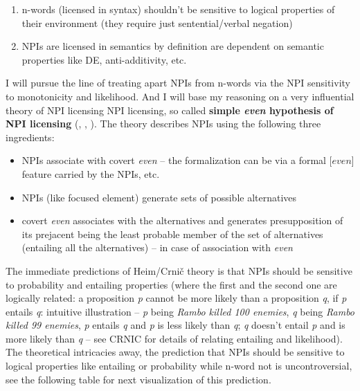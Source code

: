 \documentclass[12pt]{scrartcl}
\providecommand{\tightlist}{%
  \setlength{\itemsep}{0pt}\setlength{\parskip}{0pt}}
\begin{document}
\begin{enumerate}
  \def\labelenumi{\arabic{enumi})}
  \tightlist
  \item
    n-words (licensed in syntax) shouldn't be sensitive to logical properties of
    their environment (they require just sentential/verbal negation)
  \item
    NPIs are licensed in semantics by definition are dependent on semantic properties like DE, anti-additivity, etc.
\end{enumerate}

I will pursue the line of treating apart NPIs from n-words via the NPI sensitivity to monotonicity and likelihood. And I will base my reasoning on a very influential theory of NPI licensing NPI licensing, so called \textbf{simple
  \emph{even} hypothesis of NPI licensing} (\citealt{heim1984note},  \citealt{krifka1995semantics}, \citealt{crnivc2014against}). The theory describes NPIs using the following three ingredients:

  \begin{itemize}
  \tightlist
  \item
    NPIs associate with covert \emph{even} -- the formalization can be via a formal [$even$] feature carried by the NPIs, etc.
  \item
    NPIs (like focused element) generate sets of possible alternatives
  \item
    covert \emph{even} associates with the alternatives and generates
    presupposition of its prejacent being the least probable member of
    the set of alternatives (entailing all the alternatives) -- in case of association with \textit{even}
  \end{itemize}

The immediate predictions of Heim/Crnič theory is that NPIs should be sensitive to probability and entailing properties (where the first and the second one are logically related: a proposition \textit{p} cannot be more likely than a proposition \textit{q}, if \textit{p} entails \textit{q}: intuitive illustration -- \textit{p} being \textit{Rambo killed 100 enemies}, \textit{q} being \textit{Rambo killed 99 enemies}, \textit{p} entails \textit{q} and \textit{p} is less likely than \textit{q}; \textit{q} doesn't entail \textit{p} and is more likely than \textit{q} -- see CRNIC for details of relating entailing and likelihood). The theoretical intricacies away, the prediction that NPIs should be sensitive to logical properties like entailing or probability while n-word not is uncontroversial, see the following table for next visualization of this prediction.
\end{document}

